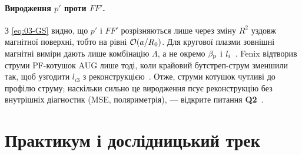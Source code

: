 \paragraph{Виродження $p'$ проти $FF'$.} З \eqref{eq:03-GS} видно, що $p'$ і $FF'$ розрізняються лише через зміну $R^2$ уздовж магнітної поверхні, тобто на рівні $\mathcal{O}\!\left(a/R_0\right)$. Для кругової плазми зовнішні магнітні виміри дають лише комбінацію $\Lambda$, а не окремо $\beta_{\mathrm{p}}$ і $l_{i}$~\cite[с.~35]{Merlo2011}. Fenix відтворив струми PF-котушок AUG лише тоді, коли крайовий бутстреп-струм зменшили так, щоб узгодити $l_{i3}$ з реконструкцією~\cite[с.~6--7]{Fable2022}. Отже, струми котушок чутливі до профілю струму; наскільки сильно це виродження псує реконструкцію без внутрішніх діагностик (MSE, поляриметрія), --- відкрите питання \textbf{Q2}~\cite{ProjRegisters}.

\section{Практикум і дослідницький трек}\label{sec:03-practice}


